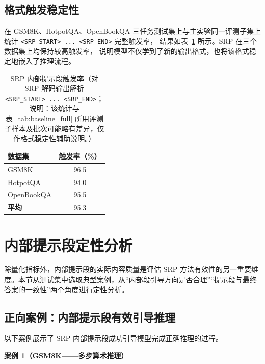 \subsection{格式触发稳定性}

在 GSM8K、HotpotQA、OpenBookQA 三任务测试集上与主实验同一评测子集上统计 \texttt{<SRP\_START> ... <SRP\_END>} 完整触发率，
结果如表~\ref{tab:trigger_rate} 所示。SRP 在三个数据集上均保持较高触发率，
说明模型不仅学到了新的输出格式，也将该格式稳定地嵌入了推理流程。

\begin{table}[htbp]
    \centering
    \caption{SRP 内部提示段触发率（对 SRP 解码输出解析 \texttt{<SRP\_START> ... <SRP\_END>}；说明：该统计与表~\ref{tab:baseline_full} 所用评测子样本及批次可能略有差异，仅作格式稳定性辅助说明。）}
    \label{tab:trigger_rate}
    \begin{tabular}{lc}
        \toprule
        \textbf{数据集} & \textbf{触发率（\%）} \\
        \midrule
        GSM8K      & 96.5 \\
        HotpotQA   & 94.0 \\
        OpenBookQA & 95.5 \\
        \midrule
        \textbf{平均} & 95.3 \\
        \bottomrule
    \end{tabular}
\end{table}

\section{内部提示段定性分析}

除量化指标外，内部提示段的实际内容质量是评估 SRP 方法有效性的另一重要维度。本节从测试集中选取典型案例，从“内部段引导方向是否合理”“提示段与最终答案的一致性”两个角度进行定性分析。

\subsection{正向案例：内部提示段有效引导推理}

以下案例展示了 SRP 内部提示段成功引导模型完成正确推理的过程。

\textbf{案例 1（GSM8K——多步算术推理）}

